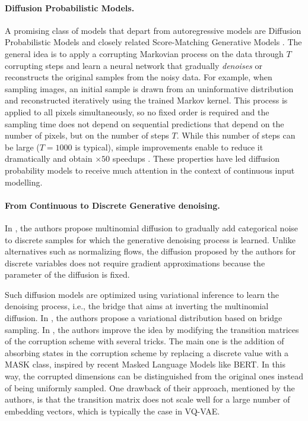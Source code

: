 \documentclass[nolayout]{article}
\theoremstyle{plain}
\theoremstyle{definition}
\theoremstyle{remark}
\begin{document}
\paragraph{Diffusion Probabilistic Models.}
A promising class of models that depart from autoregressive models are Diffusion Probabilistic Models \cite{sohldickstein2015deep, ho2020denoising} and closely related Score-Matching Generative Models \cite{song2019generative, de2021simulating}. The general idea is to apply a corrupting Markovian process on the data through $T$ corrupting steps and learn a neural network that gradually \textit{denoises} or reconstructs the original samples from the noisy data.
For example, when sampling images, an initial sample is drawn from an uninformative distribution and reconstructed iteratively using the trained Markov kernel. This process is applied to all pixels simultaneously, so no fixed order is required and the sampling time does not depend on sequential predictions that depend on the number of pixels, but on the number of steps $T$. While this number of steps can be large ($T=1000$ is typical), simple improvements enable to reduce it dramatically and obtain $\times 50$ speedups \cite{song2021denoising}. These properties have led diffusion probability models to receive much attention in the context of continuous input modelling.


\paragraph{From Continuous to Discrete Generative denoising.}
In \cite{hoogeboom2021argmax}, the authors propose multinomial diffusion to gradually add categorical noise to discrete samples for which the generative denoising process is learned. Unlike alternatives such as normalizing flows, the diffusion proposed by the authors for discrete variables does not require gradient approximations because the parameter of the diffusion is fixed.

Such diffusion models are optimized using variational inference to learn the denoising process, i.e., the bridge that aims at inverting the multinomial diffusion. In \cite{hoogeboom2021argmax}, the authors propose a variational distribution based on bridge sampling.  
In \cite{austin2021structured}, the authors improve the idea by modifying the transition matrices of the corruption scheme with several tricks. The main one is the addition of absorbing states in the corruption scheme by replacing a discrete value with a MASK class, inspired by recent Masked Language Models like BERT. In this way, the corrupted dimensions can be distinguished from the original ones instead of being uniformly sampled. 
One drawback of their approach, mentioned by the authors, is that the transition matrix does not scale well for a large number of embedding vectors, which is typically the case in VQ-VAE.
\end{document}
